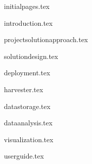 \documentclass[a4paper, 12pt]{article}
\begin{document}
{initialpages.tex}

\newpage

{introduction.tex}


{projectsolutionapproach.tex}

{solutiondesign.tex}

{deployment.tex}

{harvester.tex}

{datastorage.tex}

{dataanalysis.tex}

{visualization.tex}

{userguide.tex}



\end{document}
